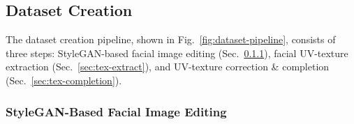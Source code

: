 \documentclass[10pt,twocolumn,letterpaper]{article}
\begin{document}
\begin{table}[!t]
\caption{Comparisons with existing UV-texture datasets, where  denotes the dataset which is captured under controlled conditions.}
\small
\centering
{}
\label{tab:uv-tex-dataset}
\end{table}
 

\subsection{Dataset Creation}
\label{sec:datasetcreate}

The dataset creation pipeline, shown in Fig.~\ref{fig:dataset-pipeline}, consists of three steps: StyleGAN-based facial image editing (Sec.~\ref{sec:face-edit}), facial UV-texture extraction (Sec.~\ref{sec:tex-extract}), and UV-texture correction \& completion (Sec.~\ref{sec:tex-completion}). 


\vspace{-2mm}
\subsubsection{StyleGAN-Based Facial Image Editing}
\label{sec:face-edit}
\vspace{-2mm}
\end{document}
